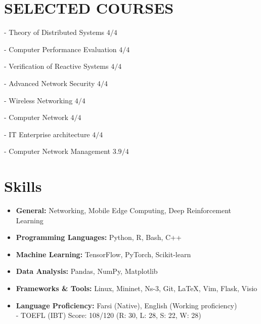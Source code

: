 \documentclass[11pt]{article}
\begin{document}
\section{SELECTED COURSES}
		\vspace{-5mm}
	     \setlength\itemsep{0em}
	     \begin{multicols}{2}
				- Theory of Distributed Systems  \hfill $4/4$ 
				
			    -  Computer Performance Evaluation \hfill $4/4$
			    
			    - Verification of Reactive Systems  \hfill  $4/4$
			     
				 - Advanced Network Security  \hfill $4/4$
				 
		         - Wireless Networking  \hfill $4/4$
		         
		         - Computer Network  \hfill $4/4$
		         
		          - IT Enterprise architecture  \hfill  $4/4$
		         
		         - Computer Network Management  \hfill $3.9/4$
		         

		         
		     \end{multicols}


\section{Skills}



\begin{itemize}[noitemsep,topsep=0pt,parsep=0pt,partopsep=0pt]
	\item {\textbf{General:} Networking, Mobile Edge Computing, Deep Reinforcement Learning}\vspace{1mm}
	\item {\textbf{Programming Languages:} Python, R, Bash, C++}\vspace{1mm}
	\item {\textbf{Machine Learning:} TensorFlow, PyTorch, Scikit-learn}\vspace{1mm}
	\item {\textbf{Data Analysis:} Pandas, NumPy, Matplotlib}\vspace{1mm}
	\item {\textbf{Frameworks \& Tools:} Linux, Mininet, Ns-3, Git, \LaTeX, Vim, Flask, Visio}\vspace{1mm}
	\item {\textbf{Language Proficiency:} Farsi (Native), English (Working proficiency)}\vspace{1mm}\\
	- TOEFL (IBT) Score: 108/120 (R: 30, L: 28, S: 22, W: 28)


\end{itemize}
\end{document}
